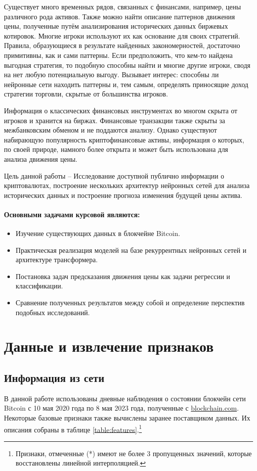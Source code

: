 \documentclass[diploma]{nanolab2015}
\begin{document}
Существует много временных рядов, связанных с финансами, например, цены различного рода активов. Также можно найти описание паттернов движения цены, полученные путём анализирования исторических данных биржевых котировок. Многие игроки используют их как основание для своих стратегий. Правила, образующиеся в результате найденных закономерностей, достаточно примитивны, как и сами паттерны. Если предположить, что кем-то найдена выгодная стратегия, то подобную способны найти и многие другие игроки, сводя на нет любую потенциальную выгоду. Вызывает интерес: способны ли нейронные сети находить паттерны и, тем самым, определять приносящие доход стратегии торговли, скрытые от большинства игроков.

Информация о классических финансовых инструментах во многом скрыта от игроков и хранится на биржах. Финансовые транзакции также скрыты за межбанковским обменом и не поддаются анализу. Однако существуют набирающую популярность криптофинансовые активы, информация о которых, по своей природе, намного более открыта и может быть использована для анализа движения цены.

Цель данной работы -- Исследование доступной публично информации о криптовалютах, построение нескольких архитектур нейронных сетей для анализа исторических данных и построение прогноза изменения будущей цены актива.


\paragraph*{Основными задачами курсовой являются:}
\begin{itemize}
    \item Изучение существующих данных в блокчейне Bitcoin.
    \item Практическая реализация моделей на базе рекуррентных нейронных сетей и архитектуре трансформера.
    \item Постановка задач предсказания движения цены как задачи регрессии и классификации.
    \item Сравнение полученных результатов между собой и определение перспектив подобных исследований.
\end{itemize}

\newpage
\section{Данные и извлечение признаков}
\subsection{Информация из сети}
В данной работе использованы дневные наблюдения о состоянии блокчейн сети Bitcoin с 10 мая 2020 года по 8 мая 2023 года, полученные с \href{https://www.blockchain.com/explorer/charts}{blockchain.com}. Некоторые базовые признаки также вычислены заранее поставщиком данных. Их описания собраны в таблице \ref{table:features}.\footnote{Признаки, отмеченные (*) имеют не более 3 пропущенных значений, которые восстановлены линейной интерполяцией.}
\end{document}
